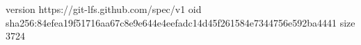 version https://git-lfs.github.com/spec/v1
oid sha256:84efea19f51716aa67c8e9e644e4eefadc14d45f261584e7344756e592ba4441
size 3724
